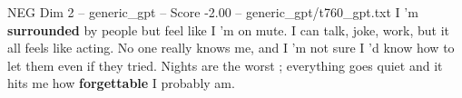 \begin{textsample}{NEG Dim 2 – generic\_gpt – Score -2.00 – generic\_gpt/t760\_gpt.txt}  \label{ex:f2_neg_006}
I ’m \textbf{surrounded} by people but feel like I ’m on mute.
I can talk, joke, work, but it all feels like acting.
No one really knows me, and I ’m not sure I ’d know how to let them even if they tried.
Nights are the worst ; everything goes quiet and it hits me how \textbf{forgettable} I probably am.

\end{textsample}
